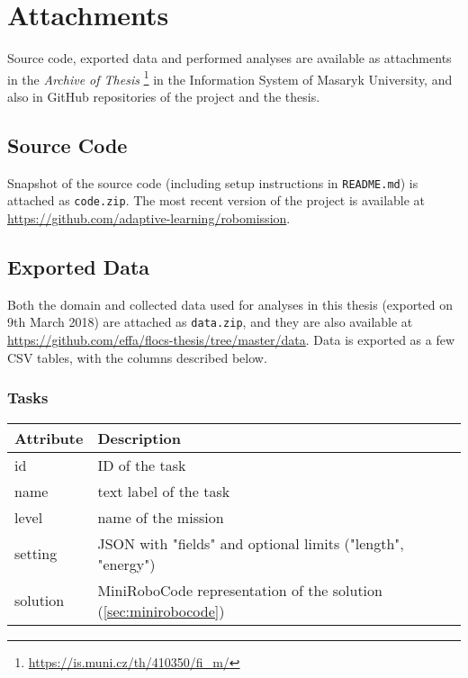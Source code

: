 \chapter{Attachments}
\label{chap:attachments}

Source code, exported data and performed analyses
are available as attachments in the \emph{Archive of Thesis}%
\footnote{\url{https://is.muni.cz/th/410350/fi\_m/}}
in the Information System of Masaryk University,
and also in GitHub repositories of the project and the thesis.

\section{Source Code}
\label{sec:attachment.source-code}

Snapshot of the source code
(including setup instructions in \texttt{README.md})
is attached as \texttt{code.zip}.
The most recent version of the project is available at
\url{https://github.com/adaptive-learning/robomission}.

\section{Exported Data}
\label{sec:attachment.collected-data}

Both the domain and collected data used for analyses in this
thesis (exported on 9th March 2018) are attached as
\texttt{data.zip}, and they are also available at
\url{https://github.com/effa/flocs-thesis/tree/master/data}.
Data is exported as a few CSV tables,
with the columns described below.

\subsection{Tasks}

\begin{tabular}{l l}
\toprule
Attribute & Description \\
\midrule
id & ID of the task \\
name & text label of the task \\
level & name of the mission \\
setting & JSON with "fields" and optional limits ("length", "energy") \\
solution & MiniRoboCode representation of the solution (\cref{sec:minirobocode}) \\
\bottomrule
\end{tabular}

